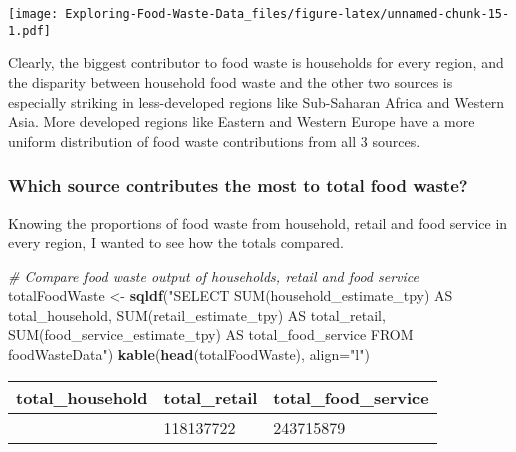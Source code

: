 \documentclass[
]{article}
\newenvironment{Shaded}{\begin{snugshade}}{\end{snugshade}}
\newcommand{\AttributeTok}[1]{\textcolor[rgb]{0.13,0.29,0.53}{#1}}
\newcommand{\CommentTok}[1]{\textcolor[rgb]{0.56,0.35,0.01}{\textit{#1}}}
\newcommand{\FunctionTok}[1]{\textcolor[rgb]{0.13,0.29,0.53}{\textbf{#1}}}
\newcommand{\NormalTok}[1]{#1}
\newcommand{\OtherTok}[1]{\textcolor[rgb]{0.56,0.35,0.01}{#1}}
\newcommand{\StringTok}[1]{\textcolor[rgb]{0.31,0.60,0.02}{#1}}
\begin{document}
\texttt{[image: Exploring-Food-Waste-Data\_files/figure-latex/unnamed-chunk-15-1.pdf]}

Clearly, the biggest contributor to food waste is households for every
region, and the disparity between household food waste and the other two
sources is especially striking in less-developed regions like
Sub-Saharan Africa and Western Asia. More developed regions like Eastern
and Western Europe have a more uniform distribution of food waste
contributions from all 3 sources.

\hypertarget{which-source-contributes-the-most-to-total-food-waste}{%
\subsubsection{Which source contributes the most to total food
waste?}\label{which-source-contributes-the-most-to-total-food-waste}}

Knowing the proportions of food waste from household, retail and food
service in every region, I wanted to see how the totals compared.

\begin{Shaded}
\begin{Highlighting}[]
\CommentTok{\# Compare food waste output of households, retail and food service}
\NormalTok{totalFoodWaste }\OtherTok{\textless{}{-}} \FunctionTok{sqldf}\NormalTok{(}\StringTok{"SELECT SUM(household\_estimate\_tpy) AS total\_household, SUM(retail\_estimate\_tpy) AS total\_retail, SUM(food\_service\_estimate\_tpy) AS total\_food\_service FROM foodWasteData"}\NormalTok{)}
\FunctionTok{kable}\NormalTok{(}\FunctionTok{head}\NormalTok{(totalFoodWaste), }\AttributeTok{align=}\StringTok{"l"}\NormalTok{)}
\end{Highlighting}
\end{Shaded}

\begin{longtable}[]{@{}lll@{}}
\toprule\noalign{}
total\_household & total\_retail & total\_food\_service \\
\midrule\noalign{}
\endhead
\bottomrule\noalign{}
\endlastfoot
569003670 & 118137722 & 243715879 \\
\end{longtable}
\end{document}
